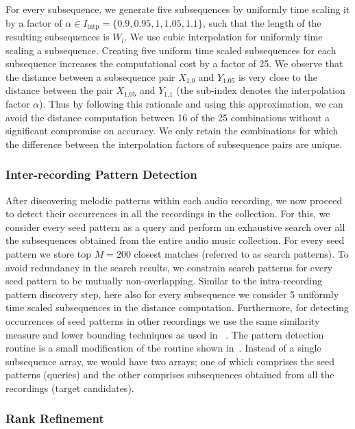 For every subsequence, we generate five subsequences by uniformly time scaling it by a factor of $\alpha \in I_{\text{intp}} =\lbrace 0.9, 0.95, 1, 1.05, 1.1\rbrace$, such that the length of the resulting subsequences is $W_l$. We use cubic interpolation for uniformly time scaling a subsequence. Creating five uniform time scaled subsequences for each subsequence increases the computational cost by a factor of 25. We observe that the distance between a subsequence pair $X_{1.0}$ and $Y_{1.05}$ is very close to the distance between the pair $X_{1.05}$ and $Y_{1.1}$ (the sub-index denotes the interpolation factor $\alpha$). Thus by following this rationale and using this approximation, we can avoid the distance computation between 16 of the 25 combinations without a significant compromise on accuracy. We only retain the combinations for which the difference between the interpolation factors of subsequence pairs are unique. 

\subsubsection{Inter-recording Pattern Detection}
\label{sec:inter_recording_pattern_search}

After discovering melodic patterns within each audio recording, we now proceed to detect their occurrences in all the recordings in the collection. For this, we consider every seed pattern as a query and perform an exhaustive search over all the subsequences obtained from the entire audio music collection. For every seed pattern we store top $M=200$ closest matches (referred to as search patterns). To avoid redundancy in the search results, we constrain search patterns for every seed pattern to be mutually non-overlapping. Similar to the intra-recording pattern discovery step, here also for every subsequence we consider 5 uniformly  time scaled subsequences in the distance computation. Furthermore, for detecting occurrences of seed patterns in other recordings we use the same similarity measure and lower bounding techniques as used in ~. The pattern detection routine is a small modification of the routine shown in~. Instead of a single subsequence array, we would have two arrays; one of which comprises the seed patterns (queries) and the other comprises subsequences obtained from all the recordings (target candidates). 

\subsubsection{Rank Refinement}
\label{sec:rankRefinement}

